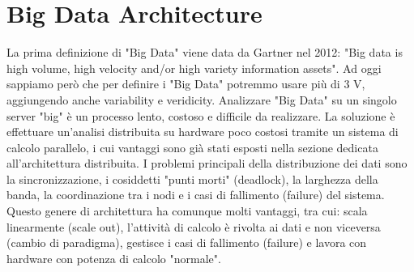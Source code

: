 \documentclass[a4page, 11pt]{article}
\begin{document}
\section{Big Data Architecture}
La prima definizione di "Big Data" viene data da Gartner nel 2012: "Big data is high volume, high velocity and/or high variety information assets". Ad oggi sappiamo però che per definire i "Big Data" potremmo usare più di 3 V, aggiungendo anche variability e veridicity. Analizzare "Big Data" su un singolo server "big" è un processo lento, costoso e difficile da realizzare. La soluzione è effettuare un’analisi distribuita su hardware poco costosi tramite un sistema di calcolo parallelo, i cui vantaggi sono già stati esposti nella sezione dedicata all'architettura distribuita. I problemi principali della distribuzione dei dati sono la sincronizzazione, i cosiddetti "punti morti" (deadlock), la larghezza della banda, la coordinazione tra i nodi e i casi di fallimento (failure) del sistema. Questo genere di architettura ha comunque molti vantaggi, tra cui: scala linearmente (scale out), l’attività di calcolo è rivolta ai dati e non viceversa (cambio di paradigma), gestisce i casi di fallimento (failure) e lavora con hardware con potenza di calcolo "normale".
\end{document}
